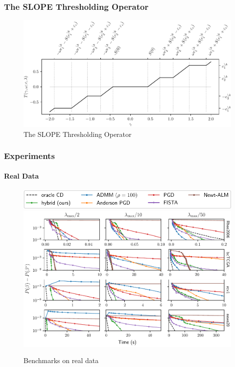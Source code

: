 \begin{frame}
  \frametitle{The SLOPE Thresholding Operator}

  \begin{figure}[htpb]
    \centering
    \includegraphics[width=\textwidth]{figures/slope-thresholding.pdf}
    \caption{%
      The SLOPE Thresholding Operator
    }
    \label{fig:thresholding-operator}
  \end{figure}
\end{frame}

\begin{frame}
  \frametitle{Experiments}
  \framesubtitle{Real Data}

  \begin{figure}[htpb]
    \centering
    \includegraphics[scale=0.55]{figures/real_legend.pdf}
    \includegraphics[scale=0.55]{figures/real.pdf}
    \caption{%
      Benchmarks on real data
    }
  \end{figure}
\end{frame}

